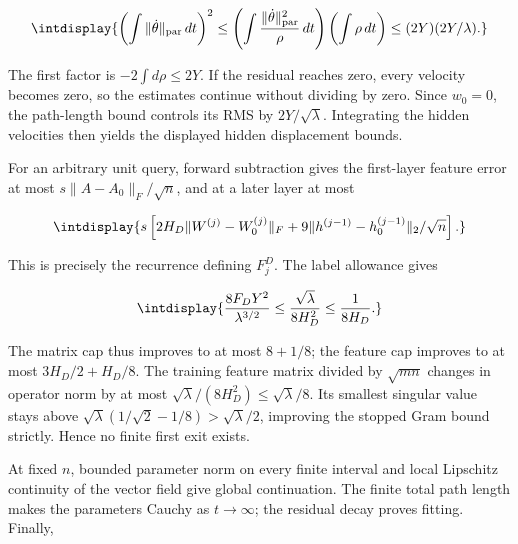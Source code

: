 \begingroup\renewcommand{\theHequation}{intdisplay.445}
\begin{equation*}
\intdisplay{
\left(\int\|\dot\theta\|_{\rm par}\,dt\right)^2
\le\left(\int\frac{\|\dot\theta\|_{\rm par}^2}{\rho}\,dt\right)
\left(\int\rho\,dt\right)
\le(2Y)(2Y/\lambda).
}
\end{equation*}
\endgroup


The first factor is \(-2\int d\rho\le2Y\). If the residual reaches zero, every velocity becomes zero, so the estimates continue without dividing by zero. Since \(w_0=0\), the path-length bound controls its RMS by \(2Y/\sqrt\lambda\). Integrating the hidden velocities then yields the displayed hidden displacement bounds.



For an arbitrary unit query, forward subtraction gives the first-layer feature error at most \(s\|A-A_0\|_F/\sqrt n\), and at a later layer at most


\begingroup\renewcommand{\theHequation}{intdisplay.446}
\begin{equation*}
\intdisplay{
s\left[2H_D\|W^{(j)}-W_0^{(j)}\|_F+
9\|h^{(j-1)}-h_0^{(j-1)}\|_2/\sqrt n\right].
}
\end{equation*}
\endgroup


This is precisely the recurrence defining \(F_j^D\). The label allowance gives


\begingroup\renewcommand{\theHequation}{intdisplay.447}
\begin{equation*}
\intdisplay{
\frac{8F_DY^2}{\lambda^{3/2}}
\le\frac{\sqrt\lambda}{8H_D^2}\le\frac1{8H_D}.
}
\end{equation*}
\endgroup


The matrix cap thus improves to at most \(8+1/8\); the feature cap improves to at most \(3H_D/2+H_D/8\). The training feature matrix divided by \(\sqrt{mn}\) changes in operator norm by at most \(\sqrt\lambda/(8H_D^2)\le\sqrt\lambda/8\). Its smallest singular value stays above \(\sqrt\lambda(1/\sqrt2-1/8)>\sqrt\lambda/2\), improving the stopped Gram bound strictly. Hence no finite first exit exists.



At fixed \(n\), bounded parameter norm on every finite interval and local Lipschitz continuity of the vector field give global continuation. The finite total path length makes the parameters Cauchy as \(t\to\infty\); the residual decay proves fitting. Finally,


